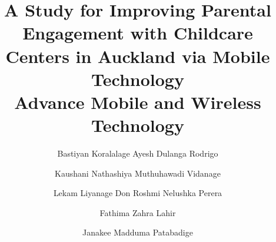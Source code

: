 \begin{titlepage}
\centering
\title{A Study for Improving Parental Engagement with Childcare Centers in Auckland via Mobile Technology \\
  \large Advance Mobile and Wireless Technology}


\author{{Bastiyan Koralalage Ayesh Dulanga Rodrigo}
{}}
 
\author{Kaushani Nathashiya Muthuhawadi Vidanage}
\author{Lekam Liyanage Don Roshmi Nelushka Perera}
\author{Fathima Zahra Lahir}
\author{Janakee Madduma Patabadige}


\address{Faculty of Information Technology, Eastern Institute of Technology, Auckland 2024, New Zealand}

\end{titlepage}
